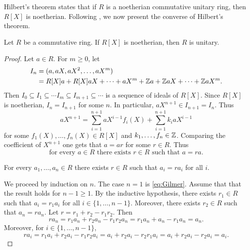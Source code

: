 \chapter{}


Hilbert's theorem states that 
if $R$ is a noetherian 
commutative unitary ring, then
$R[X]$ is noetherian. Following \cite{MR212007}, 
we now present the converse of Hilbert's theorem. 

\begin{theorem}[Gilmer]
    Let $R$ be a commutative ring. If $R[X]$ is noetherian, 
    then $R$ is unitary. 
\end{theorem}

\begin{proof}
    Let $a\in R$. For $m\geq0$, let
    \begin{align*}
    I_n&=(a,aX,aX^2,\dots,aX^m)\\
    &=R[X]a+R[X]aX+\cdots+aX^m+\mathbb{Z} a+\mathbb{Z} aX+\cdots+\mathbb{Z} aX^m.
    \end{align*}
    Then $I_0\subseteq I_1\subseteq\cdots I_m\subseteq I_{m+1}\subseteq\cdots$ 
    is a sequence of ideals of $R[X]$. Since $R[X]$ is noetherian,
    $I_n=I_{n+1}$ for some $n$. In particular, 
    $aX^{n+1}\in I_{n+1}=I_n$. Thus
    \[
    aX^{n+1}=\sum_{i=1}^{n+1} aX^{i-1}f_i(X)+\sum_{i=1}^{n+1} k_iaX^{i-1}
    \]
    for some $f_1(X),\dots,f_n(X)\in R[X]$ and 
    $k_1,\dots,f_n\in\mathbb{Z}$. Comparing the coefficient of $X^{n+1}$ 
    one gets that $a=ar$ for some $r\in R$. 
    Thus  
    \begin{equation}
        \label{eq:Gilmer}
        \text{for every $a\in R$ there exists $r\in R$ 
    such that $a=ra$.}
    \end{equation}
    
    \begin{claim}
        For every $a_1,\dots,a_n\in R$ there exists $r\in R$ 
        such that $a_i=ra_i$ for all $i$. 
    \end{claim}
    
    We proceed by induction on $n$. 
    The case $n=1$ is \eqref{eq:Gilmer}. Assume that
    that the result holds for $n-1\geq1$. By the inductive hypothesis, 
    there exists $r_1\in R$ such that $a_i=r_1a_i$ 
    for all $i\in\{1,\dots,n-1\}$. Moreover, 
    there exists $r_2\in R$ such that $a_n=ra_n$. 
    Let $r=r_1+r_2-r_1r_2$. Then
    \[
    ra_n=r_1a_n+r_2a_n-r_1r_2a_n=r_1a_n+a_n-r_1a_n=a_n.
    \]
    Moreover, for $i\in\{1,\dots,n-1\}$, 
    \[
    ra_i=r_1a_i+r_2a_i-r_1r_2a_i=a_i+r_2a_i-r_2r_1a_i=a_i+r_2a_i-r_2a_i=a_i.
    \]
    

\end{proof}
